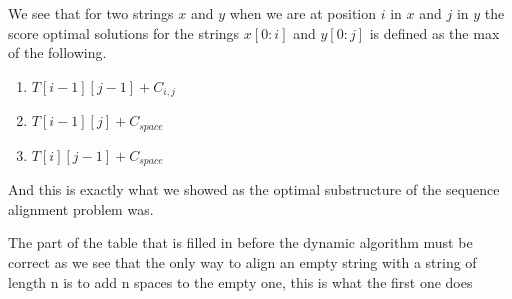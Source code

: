 \documentclass{article}
\begin{document}
					We see that for two strings $x$ and $y$ when we are at position $i$ in $x$ and $j$ in $y$ the score optimal solutions for the strings $x[0:i]$ and $y[0:j]$ is defined as the max of the following.
					
					\begin{enumerate}
						\item $T[i-1][j-1] + C_{i, j}$
						\item $T[i-1][j] + C_{space}$
						\item $T[i][j-1] + C_{space}$
					\end{enumerate}
					
					And this is exactly what we showed as the optimal substructure of the sequence alignment problem was.
					
					The part of the table that is filled in before the dynamic algorithm must be correct as we see that the only way to align an empty string with a string of length n is to add n spaces to the empty one, this is what the first one does
			
				\newpage			
			
\end{document}
